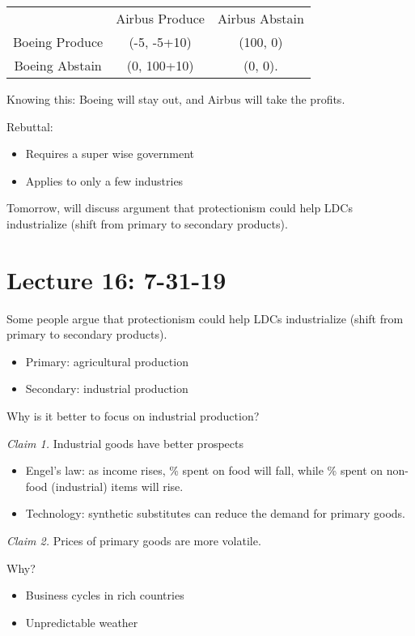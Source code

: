 \documentclass{article}
\begin{document}
\begin{tabular}{|c|c|c|}
  & Airbus Produce & Airbus Abstain \\
  Boeing Produce & (-5, -5+10) & (100, 0) \\
  Boeing Abstain & (0, 100+10) & (0, 0).
\end{tabular}

Knowing this: Boeing will stay out, and Airbus will take the profits.

Rebuttal:

\begin{itemize}
  \item Requires a super wise government
  \item Applies to only a few industries
\end{itemize}

Tomorrow, will discuss argument that protectionism could help LDCs industrialize (shift from primary to secondary products).

\section{Lecture 16: 7-31-19}

Some people argue that protectionism could help LDCs industrialize (shift from primary to secondary products).

\begin{itemize}
  \item Primary: agricultural production
  \item Secondary: industrial production
\end{itemize}

Why is it better to focus on industrial production?

{\it Claim 1.} Industrial goods have better prospects
\begin{itemize}
  \item Engel's law: as income rises, \% spent on food will fall, while \% spent on non-food (industrial) items will rise.
  \item Technology: synthetic substitutes can reduce the demand for primary goods.
\end{itemize}

{\it Claim 2.} Prices of primary goods are more volatile.

Why?
\begin{itemize}
  \item Business cycles in rich countries
  \item Unpredictable weather
\end{itemize}
\end{document}
